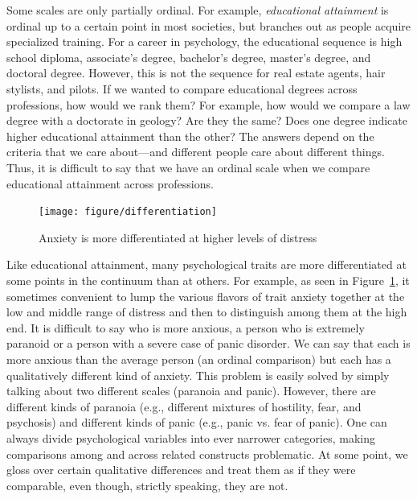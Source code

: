 \documentclass[nohyper,justified,marginals=raggedright]{tufte-book}\usepackage[]{graphicx}\usepackage[]{color}
\newenvironment{knitrout}{}{} %
\begin{document}
Some scales are only partially ordinal. For example, \emph{educational attainment} is ordinal up to a certain point in most societies, but branches out as people acquire specialized training. For a career in psychology, the educational sequence is high school diploma, associate's degree, bachelor's degree, master's degree, and doctoral degree. However, this is not the sequence for real estate agents, hair stylists, and pilots. If we wanted to compare educational degrees across professions, how would we rank them? For example, how would we compare a law degree with a doctorate in geology? Are they the same? Does one degree indicate higher educational attainment than the other? The answers depend on the criteria that we care about---and different people care about different things. Thus, it is difficult to say that we have an ordinal scale when we compare educational attainment across professions. 

\begin{figure} 
\begin{knitrout}
\color{fgcolor}
\texttt{[image: figure/differentiation]} 

\end{knitrout}
\caption{Anxiety is more differentiated at higher levels of distress}
\label{fig:differentiation}
\end{figure}

Like educational attainment, many psychological traits are more differentiated at some points in the continuum than at others. For example, as seen in Figure~\ref{fig:differentiation}, it sometimes convenient to lump the various flavors of trait anxiety together at the low and middle range of distress and then to distinguish among them at the high end. It is difficult to say who is more anxious, a person who is extremely paranoid or a person with a severe case of panic disorder. We can say that each is more anxious than the average person (an ordinal comparison) but each has a qualitatively different kind of anxiety. This problem is easily solved by simply talking about two different scales (paranoia and panic). However, there are different kinds of paranoia (e.g., different mixtures of hostility, fear, and psychosis) and different kinds of panic (e.g., panic vs. fear of panic). One can always divide psychological variables into ever narrower categories, making comparisons among and across related constructs problematic. At some point, we gloss over certain qualitative differences and treat them as if they were comparable, even though, strictly speaking, they are not.
\end{document}

